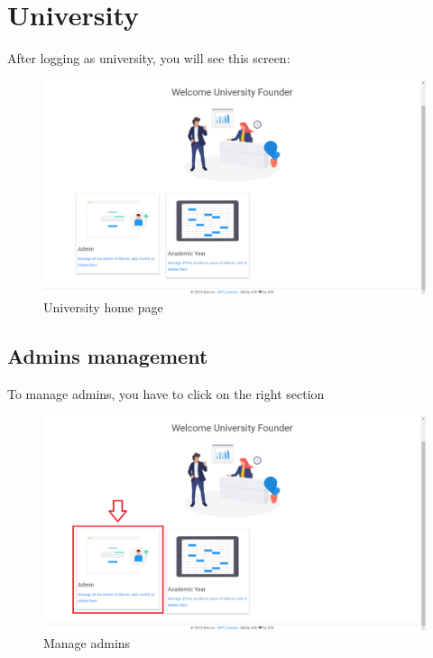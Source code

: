 \documentclass[ManualeUtente]{subfiles}
\begin{document}
\chapter{University}
After logging as university, you will see this screen:
\begin{figure}[H]
	\centering
	\includegraphics[width=0.7\linewidth]{./image/University}
	\caption[University]{University home page}
	\label{fig:university1}
\end{figure}
\newpage
\section{Admins management}
To manage admins, you have to click on the right section\\
\begin{figure}[H]
	\centering
	\includegraphics[width=0.7\linewidth]{./image/UniAdmin}
	\caption[Manage admin]{Manage admins}
	\label{fig:uniadmin}
\end{figure}
\end{document}
